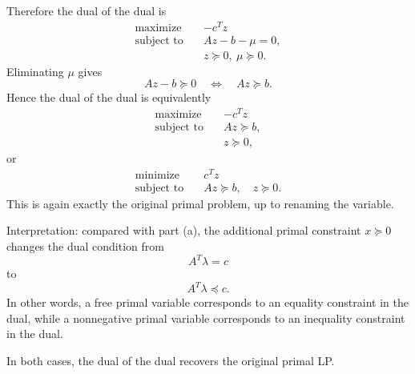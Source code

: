 \documentclass[11pt,letter,notitlepage]{article}
\theoremstyle{definition}
\begin{document}
\begin{solution}
\begin{enumerate}
    Therefore the dual of the dual is
    \[
    \begin{aligned}
        \text{maximize}\quad & -c^T z\\
        \text{subject to}\quad & Az-b-\mu=0,\\
        & z \succeq 0,\ \mu \succeq 0.
    \end{aligned}
    \]
    Eliminating $\mu$ gives
    \[
    Az-b \succeq 0
    \quad\Longleftrightarrow\quad
    Az \succeq b.
    \]
    Hence the dual of the dual is equivalently
    \[
    \begin{aligned}
        \text{maximize}\quad & -c^T z\\
        \text{subject to}\quad & Az \succeq b,\\
        & z \succeq 0,
    \end{aligned}
    \]
    or
    \[
    \begin{aligned}
        \text{minimize}\quad & c^T z\\
        \text{subject to}\quad & Az \succeq b,\quad z \succeq 0.
    \end{aligned}
    \]
    This is again exactly the original primal problem, up to renaming the
    variable.

    \medskip
    Interpretation: compared with part (a), the additional primal constraint
    $x \succeq 0$ changes the dual condition from
    \[
    A^T\lambda=c
    \]
    to
    \[
    A^T\lambda \preceq c.
    \]
    In other words, a free primal variable corresponds to an equality
    constraint in the dual, while a nonnegative primal variable corresponds
    to an inequality constraint in the dual.
\end{enumerate}

In both cases, the dual of the dual recovers the original primal LP.

\end{solution}

\newpage
\end{document}
